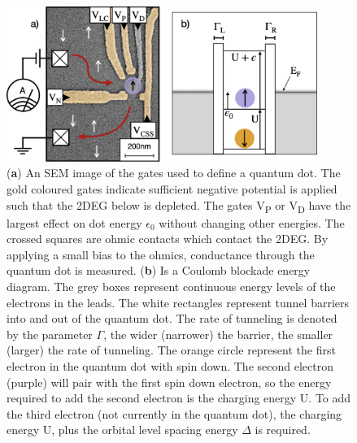 \begin{figure}[!htb]
  \begin{center}
    \includegraphics[width=0.9\textwidth]{figures/ch1/crop_FiguresMaster.004.png}
    \caption[Quantum dot energy levels]{\label{fig:ch1/dot_energy_levels} 
    (\textbf{a}) An SEM image of the gates used to define a quantum dot. The gold coloured gates indicate sufficient negative potential is applied such that the 2DEG below is depleted. The gates V\textsubscript{P} or V\textsubscript{D} have the largest effect on dot energy $\epsilon_0$ without changing other energies. The crossed squares are ohmic contacts which contact the 2DEG. By applying a small bias to the ohmics, conductance through the quantum dot is measured. (\textbf{b}) Is a Coulomb blockade energy diagram. The grey boxes represent continuous energy levels of the electrons in the leads. The white rectangles represent tunnel barriers into and out of the quantum dot. The rate of tunneling is denoted by the parameter $\Gamma$, the wider (narrower) the barrier, the smaller (larger) the rate of tunneling. The orange circle represent the first electron in the quantum dot with spin down. The second electron (purple) will pair with the first spin down electron, so the energy required to add the second electron is the charging energy $\mathrm{U}$. To add the third electron (not currently in the quantum dot), the charging energy $\mathrm{U}$, plus the orbital level spacing energy $\Delta$ is required.}
  \end{center}
\end{figure}


